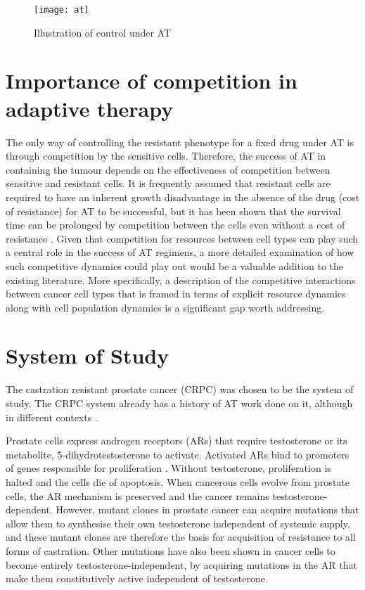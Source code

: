 \begin{figure}[h]
  \centering
  \texttt{[image: at]}
  \caption{Illustration of control under AT}
  \label{at}
\end{figure}

\section{Importance of competition in adaptive therapy}
The only way of controlling the resistant phenotype for a fixed drug under AT is through competition by the sensitive cells. Therefore, the success of AT in containing the tumour depends on the effectiveness of competition between sensitive and resistant cells. It is frequently assumed that resistant cells are required to have an inherent growth disadvantage in the absence of the drug (cost of resistance) for AT to be successful, but it has been shown that the survival time can be prolonged by competition between the cells even without a cost of resistance \cite{Strobl}. Given that competition for resources between cell types can play such a central role in the success of AT regimens, a more detailed examination of how such competitive dynamics could play out would be a valuable addition to the existing literature. More specifically, a description of the competitive interactions between cancer cell types that is framed in terms of explicit resource dynamics along with cell population dynamics is a significant gap worth addressing.

\section{System of Study}
The castration resistant prostate cancer (CRPC) was chosen to be the system of study. The CRPC system already has a history of AT work done on it, although in different contexts \cite{Cunningham,Zhang}.

Prostate cells express androgen receptors (ARs) that require testosterone or its metabolite, 5-dihydrotestosterone to activate. Activated ARs bind to promoters of genes responsible for proliferation \cite{Heinlein}. Without testosterone, proliferation is halted and the cells die of apoptosis. When cancerous cells evolve from prostate cells, the AR mechanism is preserved and the cancer remains testosterone-dependent. However, mutant clones in prostate cancer can acquire mutations that allow them to synthesise their own testosterone independent of systemic supply, and these mutant clones are therefore the basis for acquisition of resistance to all forms of castration. Other mutations have also been shown in cancer cells to become entirely testosterone-independent, by acquiring mutations in the AR that make them constitutively active independent of testosterone.

